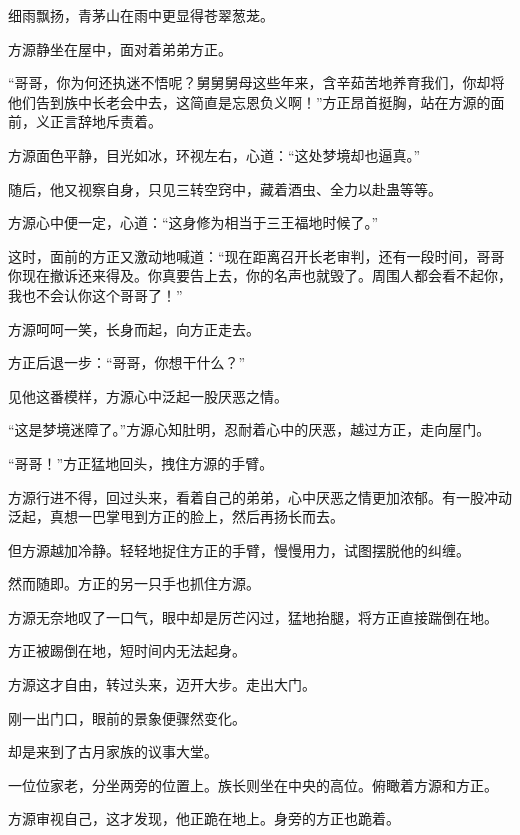 
\begin{this_body}



细雨飘扬，青茅山在雨中更显得苍翠葱茏。

方源静坐在屋中，面对着弟弟方正。

“哥哥，你为何还执迷不悟呢？舅舅舅母这些年来，含辛茹苦地养育我们，你却将他们告到族中长老会中去，这简直是忘恩负义啊！”方正昂首挺胸，站在方源的面前，义正言辞地斥责着。

方源面色平静，目光如冰，环视左右，心道：“这处梦境却也逼真。”

随后，他又视察自身，只见三转空窍中，藏着酒虫、全力以赴蛊等等。

方源心中便一定，心道：“这身修为相当于三王福地时候了。”

这时，面前的方正又激动地喊道：“现在距离召开长老审判，还有一段时间，哥哥你现在撤诉还来得及。你真要告上去，你的名声也就毁了。周围人都会看不起你，我也不会认你这个哥哥了！”

方源呵呵一笑，长身而起，向方正走去。

方正后退一步：“哥哥，你想干什么？”

见他这番模样，方源心中泛起一股厌恶之情。

“这是梦境迷障了。”方源心知肚明，忍耐着心中的厌恶，越过方正，走向屋门。

“哥哥！”方正猛地回头，拽住方源的手臂。

方源行进不得，回过头来，看着自己的弟弟，心中厌恶之情更加浓郁。有一股冲动泛起，真想一巴掌甩到方正的脸上，然后再扬长而去。

但方源越加冷静。轻轻地捉住方正的手臂，慢慢用力，试图摆脱他的纠缠。

然而随即。方正的另一只手也抓住方源。

方源无奈地叹了一口气，眼中却是厉芒闪过，猛地抬腿，将方正直接踹倒在地。

方正被踢倒在地，短时间内无法起身。

方源这才自由，转过头来，迈开大步。走出大门。

刚一出门口，眼前的景象便骤然变化。

却是来到了古月家族的议事大堂。

一位位家老，分坐两旁的位置上。族长则坐在中央的高位。俯瞰着方源和方正。

方源审视自己，这才发现，他正跪在地上。身旁的方正也跪着。


\end{this_body}
